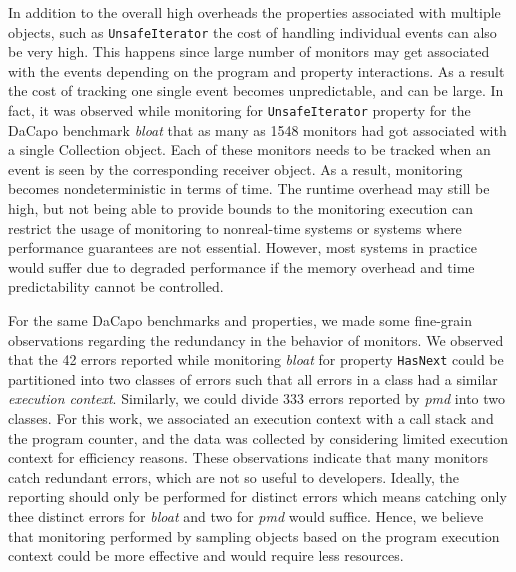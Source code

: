 In addition to the overall high overheads the properties associated with multiple objects, such as \texttt{UnsafeIterator} the cost of handling individual events can also be very high. This  happens since large number of monitors may get associated with the events depending on the program and property interactions. As a result the cost of tracking one single event becomes unpredictable, and can be large. In fact, it was observed while monitoring for \texttt{UnsafeIterator} property for the \textsf{DaCapo} benchmark \textit{bloat} that as many as 1548 monitors had got associated with a single \textsf{Collection} object. Each of these monitors needs to be tracked when an event is seen by the corresponding receiver object. As a result, monitoring becomes nondeterministic in terms of time. The runtime overhead may still be high, but not being able to provide bounds to the monitoring execution can restrict the usage of monitoring to nonreal-time systems or systems where performance guarantees are not essential. However, most systems in practice would suffer due to degraded performance if the memory overhead and time predictability cannot be controlled.


For the same DaCapo benchmarks and properties, we made some fine-grain observations regarding the redundancy in the behavior of monitors. We observed that the 42 errors reported while monitoring \textit{bloat}  for property \texttt{HasNext} could be partitioned into two classes of errors such that all errors in a class had a similar \textit{execution context}. Similarly, we could divide 333 errors reported by \textit{pmd} into two classes. For this work, we associated an execution context with a call stack and the program counter, and the data was collected  by considering limited execution context for efficiency reasons. These observations indicate that many monitors catch redundant errors, which are not so useful to developers. Ideally, the reporting should only be performed for distinct errors which means catching only thee distinct errors for \textit{bloat} and two for \textit{pmd} would suffice. Hence, we believe that monitoring performed by sampling objects based on the program execution context could be more effective and would require less resources.

